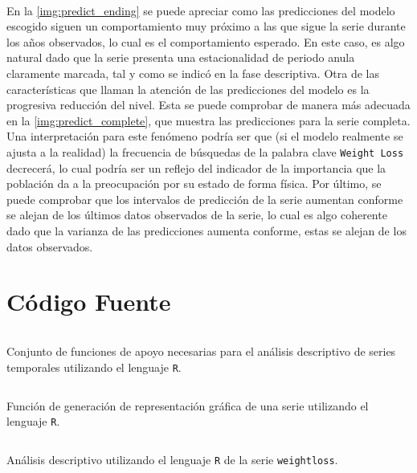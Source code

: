 \documentclass[a4paper, spanish]{article}
\begin{document}
    \paragraph{}
    En la \autoref{img:predict_ending} se puede apreciar como las predicciones del modelo escogido siguen un comportamiento muy próximo a las que sigue la serie durante los años observados, lo cual es el comportamiento esperado. En este caso, es algo natural dado que la serie presenta una estacionalidad de periodo anula claramente marcada, tal y como se indicó en la fase descriptiva. Otra de las características que llaman la atención de las predicciones del modelo es la progresiva reducción del nivel. Esta se puede comprobar de manera más adecuada en la \autoref{img:predict_complete}, que muestra las predicciones para la serie completa. Una interpretación para este fenómeno podría ser que (si el modelo realmente se ajusta a la realidad) la frecuencia de búsquedas de la palabra clave \texttt{Weight Loss} decrecerá, lo cual podría ser un reflejo del indicador de la importancia que la población da a la preocupación por su estado de forma física. Por último, se puede comprobar que los intervalos de predicción de la serie aumentan conforme se alejan de los últimos datos observados de la serie, lo cual es algo coherente dado que la varianza de las predicciones aumenta conforme, estas se alejan de los datos observados.

  \newpage
  \appendix
  \section{Código Fuente}
  \label{sec:code}

    \begin{listing}[H]
      \centering
      \inputminted{R}{./res/code/functions.r}
      \caption{Conjunto de funciones de apoyo necesarias para el análisis descriptivo de series temporales utilizando el lenguaje \texttt{R}.}
      \label{code:functions_r}
    \end{listing}

    \begin{listing}[H]
      \centering
      \inputminted{R}{./res/code/plotting.r}
      \caption{Función de generación de representación gráfica de una serie utilizando el lenguaje \texttt{R}.}
      \label{code:plotting_r}
    \end{listing}

    \begin{listing}[H]
      \centering
      \inputminted{R}{./res/code/descriptive.r}
      \caption{Análisis descriptivo utilizando el lenguaje \texttt{R} de la serie \texttt{weightloss}.}
      \label{code:descriptive_r}
    \end{listing}
\end{document}
